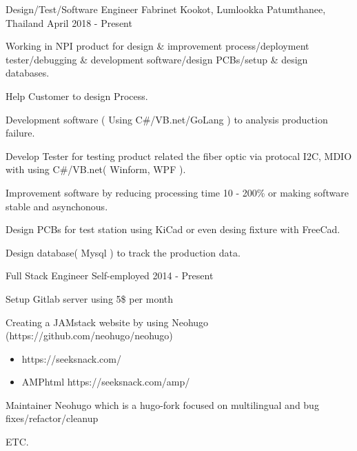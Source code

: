 
\begin{cventries}

  \cventry
    {Design/Test/Software Engineer} %
    {Fabrinet} %
    {Kookot, Lumlookka Patumthanee, Thailand} %
    {April 2018 - Present} %
    {
      \begin{cvitems} %
        \item {Working in NPI product for design \& improvement
          process/deployment tester/debugging \& development software/design
          PCBs/setup \& design databases.}
        \item {Help Customer to design Process.}
        \item {Development software ( Using C\#/VB.net/GoLang ) to analysis
          production failure.}
        \item {Develop Tester for testing product related the fiber optic via
          protocal I2C, MDIO with using C\#/VB.net( Winform, WPF ).}
        \item {Improvement software by reducing processing time 10 -  200\% or making
        software stable and asynchonous.}
        \item {Design PCBs for test station using KiCad or even desing fixture
          with FreeCad.}
        \item {Design database( Mysql ) to track the production data.}
      \end{cvitems}
    }

  \cventry
    {Full Stack Engineer} %
    {Self-employed} %
    {} %
    {2014 - Present} %
    {
      \begin{cvitems} %
        \item {Setup Gitlab server using 5\$ per month}
        \item {Creating a JAMstack website by using Neohugo
              (https://github.com/neohugo/neohugo) }
         \begin{itemize}
           \item https://seeksnack.com/
           \item AMPhtml https://seeksnack.com/amp/
         \end{itemize}
        \item {Maintainer Neohugo which is a hugo-fork focused on multilingual and bug
    fixes/refactor/cleanup}
        \item {ETC.}
      \end{cvitems}
    }


\end{cventries}
